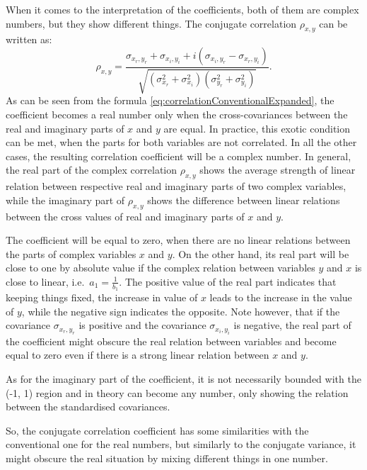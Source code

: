 \documentclass[
]{book}
\begin{document}
When it comes to the interpretation of the coefficients, both of them are complex numbers, but they show different things. The conjugate correlation \(\rho_{x,y}\) can be written as:
\begin{equation}
    {\rho}_{x,y} = \frac{\sigma_{x_r, y_r} + \sigma_{x_i, y_i} + i (\sigma_{x_i, y_r} - \sigma_{x_r, y_i})}{\sqrt{(\sigma_{x_r}^2 + \sigma_{x_i}^2)(\sigma_{y_r}^2 + \sigma_{y_i}^2)}} .
    \label{eq:correlationConventionalExpanded}
\end{equation}
As can be seen from the formula \eqref{eq:correlationConventionalExpanded}, the coefficient becomes a real number only when the cross-covariances between the real and imaginary parts of \(x\) and \(y\) are equal. In practice, this exotic condition can be met, when the parts for both variables are not correlated. In all the other cases, the resulting correlation coefficient will be a complex number. In general, the real part of the complex correlation \(\rho_{x,y}\) shows the average strength of linear relation between respective real and imaginary parts of two complex variables, while the imaginary part of \(\rho_{x,y}\) shows the difference between linear relations between the cross values of real and imaginary parts of \(x\) and \(y\).

The coefficient will be equal to zero, when there are no linear relations between the parts of complex variables \(x\) and \(y\). On the other hand, its real part will be close to one by absolute value if the complex relation between variables \(y\) and \(x\) is close to linear, i.e.~\(a_1 = \frac{1}{b_1}\). The positive value of the real part indicates that keeping things fixed, the increase in value of \(x\) leads to the increase in the value of \(y\), while the negative sign indicates the opposite. Note however, that if the covariance \(\sigma_{x_r, y_r}\) is positive and the covariance \(\sigma_{x_i, y_i}\) is negative, the real part of the coefficient might obscure the real relation between variables and become equal to zero even if there is a strong linear relation between \(x\) and \(y\).

As for the imaginary part of the coefficient, it is not necessarily bounded with the (-1, 1) region and in theory can become any number, only showing the relation between the standardised covariances.

So, the conjugate correlation coefficient has some similarities with the conventional one for the real numbers, but similarly to the conjugate variance, it might obscure the real situation by mixing different things in one number.
\end{document}
